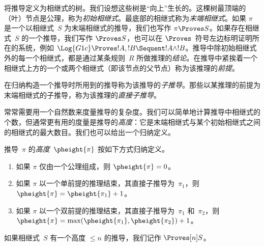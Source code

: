 \documentclass[../../../include/open-logic-section]{subfiles}
\begin{document}
 将推导定义为相继式的树。我们设想这些树是“向上”生长的。这棵树最顶端的（叶）节点是公理，称为\emph{初始相继式}。最底部的相继式称为\emph{末端相继式}。如果 $\pi$ 是一个以相继式~$S$ 为末端相继式的推导，我们也写作 $\pi \Proves S$。如果存在相继式~$S$ 的一个推导，我们写作 $\Proves S$，也可以在 $\Proves$~符号左边标明证明所在的系统，例如 $\Log{G1c} \Proves !A, !B \Sequent !A \land
!B$。推导中除初始相继式外的每一个相继式，都是通过某条规则~$R$ 所做推理的\emph{结论}。在推导中紧挨着一个相继式上方的一个或两个相继式（即该节点的父节点）称为该推理的\emph{前提}。

在归纳构造一个推导时所用到的推导称为该推导的\emph{子推导}。那些以某推理的前提为末端相继式的子推导，称为该推理的\emph{直接子推导}。

常常需要用一个自然数来度量推导的复杂度。我们可以简单地计算推导中相继式的个数，但通常更有用的度量是推导的\emph{高度}：它是末端相继式与某个初始相继式之间的相继式的最大数目。我们也可以给出一个归纳定义。

\begin{defn}
推导~$\pi$ 的\emph{高度}~$\pheight{\pi}$ 按如下方式归纳定义。
\begin{enumerate}
  \item 如果 $\pi$ 仅由一个公理组成，则 $\pheight{\pi} = 0$。
  \item 如果 $\pi$ 以一个单前提的推理结束，其直接子推导为~$\pi_1$，则 $\pheight{\pi} = \pheight{\pi_1} + 1$。
  \item 如果 $\pi$ 以一个双前提的推理结束，其直接子推导为~$\pi_1$ 和~$\pi_2$，则 $\pheight{\pi} =
  \max(\pheight{\pi_1}, \pheight{\pi_2}) + 1$。
\end{enumerate}
如果相继式~$S$ 有一个高度 $\le n$ 的推导，我们记作 $\Proves[n] S$。
\end{defn}
\end{document}
